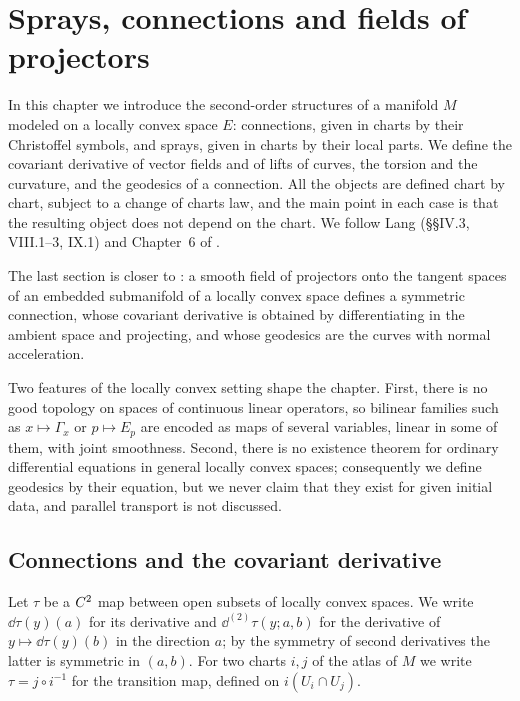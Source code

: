 \chapter{Sprays, connections and fields of projectors}
\label{chap:connections}

In this chapter we introduce the second-order structures of a manifold $M$ modeled on a locally
convex space $E$: connections, given in charts by their Christoffel symbols, and sprays, given in
charts by their local parts. We define the covariant derivative of vector fields and of lifts of
curves, the torsion and the curvature, and the geodesics of a connection. All the objects are
defined chart by chart, subject to a change of charts law, and the main point in each case is
that the resulting object does not depend on the chart. We follow Lang \cite{Lan99}
(\S\S IV.3, VIII.1--3, IX.1) and Chapter~6 of \cite{Lar22}.

The last section is closer to \cite{Lar22}: a smooth field of projectors onto the tangent spaces
of an embedded submanifold of a locally convex space defines a symmetric connection, whose
covariant derivative is obtained by differentiating in the ambient space and projecting, and
whose geodesics are the curves with normal acceleration.

Two features of the locally convex setting shape the chapter. First, there is no good topology on
spaces of continuous linear operators, so bilinear families such as $x \mapsto \Gamma_x$ or
$p \mapsto E_p$ are encoded as maps of several variables, linear in some of them, with joint
smoothness. Second, there is no existence theorem for ordinary differential equations in general
locally convex spaces; consequently we define geodesics by their equation, but we never claim that
they exist for given initial data, and parallel transport is not discussed.

\section{Connections and the covariant derivative}

Let $\tau$ be a $C^{2}$ map between open subsets of locally convex spaces. We write
$\dd\tau(y)(a)$ for its derivative and $\dd^{(2)}\tau(y; a, b)$ for the derivative of
$y \mapsto \dd\tau(y)(b)$ in the direction $a$; by the symmetry of second derivatives the latter is
symmetric in $(a, b)$. For two charts $i, j$ of the atlas of $M$ we write $\tau = j \circ i^{-1}$
for the transition map, defined on $i(U_i \cap U_j)$.

